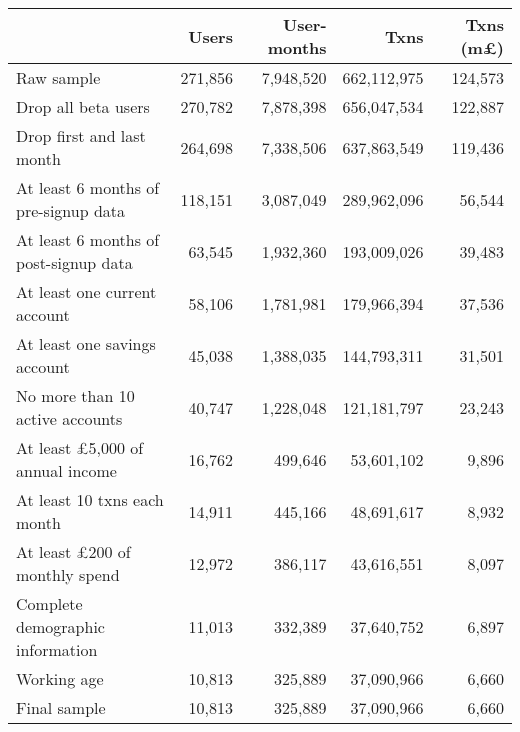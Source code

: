 \begin{tabular}{lrrrr}
\toprule
                                         &   Users & User-months &        Txns & Txns (m\pounds) \\
\midrule
                              Raw sample & 271,856 &   7,948,520 & 662,112,975 &         124,573 \\
                     Drop all beta users & 270,782 &   7,878,398 & 656,047,534 &         122,887 \\
               Drop first and last month & 264,698 &   7,338,506 & 637,863,549 &         119,436 \\
    At least 6 months of pre-signup data & 118,151 &   3,087,049 & 289,962,096 &          56,544 \\
   At least 6 months of post-signup data &  63,545 &   1,932,360 & 193,009,026 &          39,483 \\
            At least one current account &  58,106 &   1,781,981 & 179,966,394 &          37,536 \\
            At least one savings account &  45,038 &   1,388,035 & 144,793,311 &          31,501 \\
         No more than 10 active accounts &  40,747 &   1,228,048 & 121,181,797 &          23,243 \\
  At least \pounds5,000 of annual income &  16,762 &     499,646 &  53,601,102 &           9,896 \\
             At least 10 txns each month &  14,911 &     445,166 &  48,691,617 &           8,932 \\
    At least \pounds200 of monthly spend &  12,972 &     386,117 &  43,616,551 &           8,097 \\
        Complete demographic information &  11,013 &     332,389 &  37,640,752 &           6,897 \\
                             Working age &  10,813 &     325,889 &  37,090,966 &           6,660 \\
                            Final sample &  10,813 &     325,889 &  37,090,966 &           6,660 \\
\bottomrule
\end{tabular}
